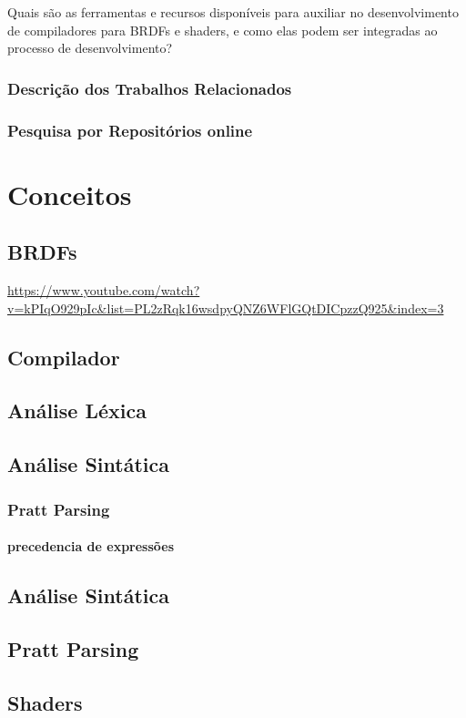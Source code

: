 \documentclass[english, 
               brazil, 
               bsc] %
               {dcomp-abntex2}
\begin{document}
Quais são as ferramentas e recursos disponíveis para auxiliar no desenvolvimento de compiladores para BRDFs e shaders, e como elas podem ser integradas ao processo de desenvolvimento?

\subsection{Descrição dos Trabalhos Relacionados}

\subsection{Pesquisa por Repositórios online}


\chapter{Conceitos}

\section{BRDFs}
\url{https://www.youtube.com/watch?v=kPIqO929pIc&list=PL2zRqk16wsdpyQNZ6WFlGQtDICpzzQ925&index=3}

\section{Compilador}
\section{Análise Léxica}
\section{Análise Sintática}
\subsection{Pratt Parsing}
\subsubsection{precedencia de expressões}
\section{Análise Sintática}
\section{Pratt Parsing}
\section{Shaders}
%
%
%
\end{document}
